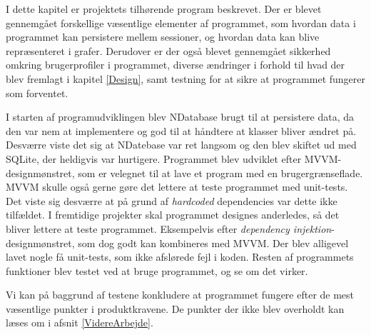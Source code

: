 I dette kapitel er projektets tilhørende program beskrevet. Der er blevet gennemgået forskellige væsentlige elementer af programmet, som hvordan data i programmet kan persistere mellem sessioner, og hvordan data kan blive repræsenteret i grafer. Derudover er der også blevet gennemgået sikkerhed omkring brugerprofiler i programmet, diverse ændringer i forhold til hvad der blev fremlagt i kapitel \ref{Design}, samt testning for at sikre at programmet fungerer som forventet.

I starten af programudviklingen blev NDatabase brugt til at persistere data, da den var nem at implementere og god til at håndtere at klasser bliver ændret på. Desværre viste det sig at NDatebase var ret langsom og den blev skiftet ud med SQLite, der heldigvis var hurtigere. Programmet blev udviklet efter MVVM-designmønstret, som er velegnet til at lave et program med en brugergrænseflade. MVVM skulle også gerne gøre det lettere at teste programmet med unit-tests.
Det viste sig desværre at på grund af \textit{hardcoded} dependencies var dette ikke tilfældet. I fremtidige projekter skal programmet designes anderledes, så det bliver lettere at teste programmet. Eksempelvis efter \textit{dependency injektion}-designmønstret, som dog godt kan kombineres med MVVM. Der blev alligevel lavet nogle få unit-tests, som ikke afslørede fejl i koden. Resten af programmets funktioner blev testet ved at bruge programmet, og se om det virker. 

Vi kan  på baggrund af testene konkludere at programmet fungere efter de mest væsentlige punkter i produktkravene. De punkter der ikke blev overholdt kan læses om i afsnit \ref{VidereArbejde}.


